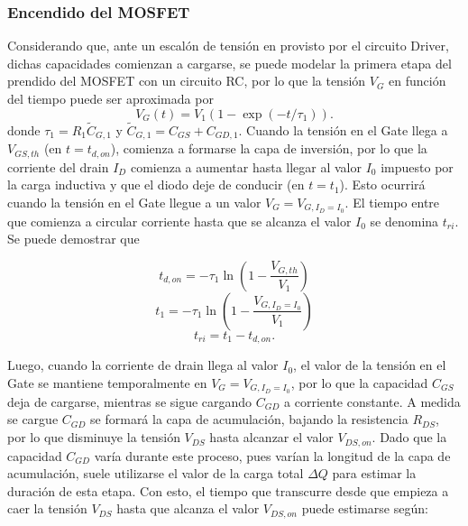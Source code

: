 \documentclass[e4_tp1_main.tex]{subfiles}
\begin{document}
\subsubsection{Encendido del MOSFET}

Considerando que, ante un escalón de tensión en provisto por el circuito Driver, dichas capacidades comienzan a cargarse, se puede modelar la primera etapa del prendido del MOSFET con un circuito RC, por lo que la tensión $V_{G}$ en función del tiempo puede ser aproximada por
\begin{equation}
V_G(t) = V_1 (1-\exp(-t/\tau_1)).
\end{equation}
donde $\tau_1 = R_1\tilde{C}_{G,1}$ y $\tilde{C}_{G,1} = C_{GS} + C_{GD,1}$. Cuando la tensión en el Gate llega a $V_{GS,th}$ (en $t=t_{d,on}$), comienza a formarse la capa de inversión, por lo que la corriente del drain $I_D$ comienza a aumentar hasta llegar al valor $I_0$ impuesto por la carga inductiva y que el diodo deje de conducir (en $t=t_1$). Esto ocurrirá cuando la tensión en el Gate llegue a un valor $V_G=V_{G,I_D=I_0}$. El tiempo entre que comienza a circular corriente hasta que se alcanza el valor $I_0$ se denomina $t_{ri}$. Se puede demostrar que

\begin{equation}
t_{d,on} = -\tau_1 \ln\left(1-\frac{V_{G,th}}{V_1}\right)
\end{equation}
\begin{equation}
t_{1} = -\tau_1 \ln\left(1-\frac{V_{G,I_D=I_0}}{V_1}\right)
\end{equation}
\begin{equation}
t_{ri} = t_{1} - t_{d,on}.
\end{equation}

Luego, cuando la corriente de drain llega al valor $I_0$, el valor de la tensión en el Gate se mantiene temporalmente en $V_G=V_{G,I_D=I_0}$, por lo que la capacidad $C_{GS}$ deja de cargarse, mientras se sigue cargando $C_{GD}$ a corriente constante. A medida se cargue $C_{GD}$ se formará la capa de acumulación, bajando la resistencia $R_{DS}$, por lo que disminuye la tensión $V_{DS}$ hasta alcanzar el valor $V_{DS,on}$. Dado que la capacidad $C_{GD}$ varía durante este proceso, pues varían la longitud de la capa de acumulación, suele utilizarse el valor de la carga total $\Delta Q$ para estimar la duración de esta etapa. Con esto, el tiempo que transcurre desde que empieza a caer la tensión $V_{DS}$ hasta que alcanza el valor $V_{DS,on}$ puede estimarse según:
\end{document}
